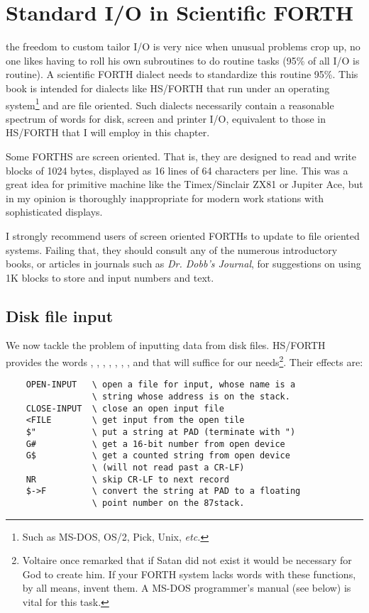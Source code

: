 \section{Standard I/O in Scientific FORTH}

 the freedom to custom tailor I/O is very nice when unusual problems crop up, no one likes having to roll his own subroutines to do routine tasks (95\% of all I/O is routine). A scientific FORTH dialect needs to standardize this routine 95\%. This book is intended for dialects like HS/FORTH that run under an operating system\footnote{Such as MS-DOS, OS/2, Pick, Unix, \textit{etc.}} and are file oriented. Such dialects necessarily contain a reasonable spectrum of words for disk, screen and printer I/O, equivalent to those in HS/FORTH that I will employ in this chapter.

Some FORTHS are screen oriented. That is, they are designed to read and write blocks of 1024 bytes, displayed as 16 lines of 64 characters per line. This was a great idea for primitive machine like the Timex/Sinclair ZX81 or Jupiter Ace, but in my opinion is thoroughly inappropriate for modern work stations with sophisticated displays.

I strongly recommend users of screen oriented FORTHs to update to file oriented systems. Failing that, they should consult any of the numerous introductory books, or articles in journals such as \textit{Dr. Dobb's Journal}, for suggestions on using 1K blocks to store and input numbers and text.

\subsection{Disk file input}
We now tackle the problem of inputting data from disk files.
HS/FORTH provides the words , , , , , , , and  that will suffice for our needs\footnote{Voltaire once remarked that if Satan did not exist it would be necessary for God to create him. If your FORTH system lacks words with these functions, by all means, invent them. A MS-DOS programmer's manual (see below) is vital for this task.}. Their effects are:

\begin{lstlisting}
    OPEN-INPUT   \ open a file for input, whose name is a
                 \ string whose address is on the stack.
    CLOSE-INPUT  \ close an open input file
    <FILE        \ get input from the open tile
    $"           \ put a string at PAD (terminate with ")
    G#           \ get a 16-bit number from open device
    G$           \ get a counted string from open device
                 \ (will not read past a CR-LF)
    NR           \ skip CR-LF to next record
    $->F         \ convert the string at PAD to a floating
                 \ point number on the 87stack.
\end{lstlisting}

